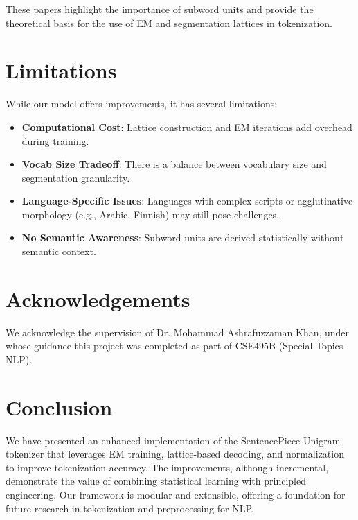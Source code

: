 \documentclass[twoside,11pt]{article}
\begin{document}
These papers highlight the importance of subword units and provide the theoretical basis for the use of EM and segmentation lattices in tokenization.

\section{Limitations}
While our model offers improvements, it has several limitations:
\begin{itemize}
    \item \textbf{Computational Cost}: Lattice construction and EM iterations add overhead during training.
    \item \textbf{Vocab Size Tradeoff}: There is a balance between vocabulary size and segmentation granularity.
    \item \textbf{Language-Specific Issues}: Languages with complex scripts or agglutinative morphology (e.g., Arabic, Finnish) may still pose challenges.
    \item \textbf{No Semantic Awareness}: Subword units are derived statistically without semantic context.
\end{itemize}

\section*{Acknowledgements}
We acknowledge the supervision of Dr. Mohammad Ashrafuzzaman Khan, under whose guidance this project was completed as part of CSE495B (Special Topics - NLP).

\section{Conclusion}
We have presented an enhanced implementation of the SentencePiece Unigram tokenizer that leverages EM training, lattice-based decoding, and normalization to improve tokenization accuracy. The improvements, although incremental, demonstrate the value of combining statistical learning with principled engineering. Our framework is modular and extensible, offering a foundation for future research in tokenization and preprocessing for NLP.
\end{document}
